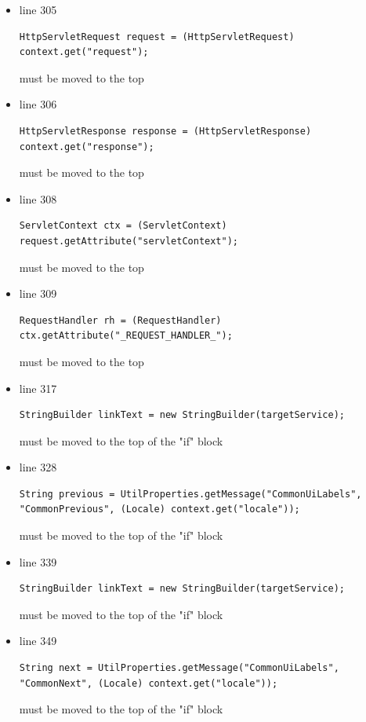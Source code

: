 \documentclass[english]{article}
\begin{document}
\begin{itemize}
{\begin{itemize}
{\begin{lstlisting}
int highIndex = (viewIndex + 1) * viewSize;
						\end{lstlisting} must be moved to the top}
				\item{line 305
						\begin{lstlisting}
HttpServletRequest request = (HttpServletRequest) context.get("request");
						\end{lstlisting} must be moved to the top}
				\item{line 306
						\begin{lstlisting}
HttpServletResponse response = (HttpServletResponse) context.get("response");
						\end{lstlisting} must be moved to the top}
				\item{line 308
						\begin{lstlisting}
ServletContext ctx = (ServletContext) request.getAttribute("servletContext");
						\end{lstlisting} must be moved to the top}
				\item{line 309
						\begin{lstlisting}
RequestHandler rh = (RequestHandler) ctx.getAttribute("_REQUEST_HANDLER_");
						\end{lstlisting} must be moved to the top}
				\item{line 317
						\begin{lstlisting}
StringBuilder linkText = new StringBuilder(targetService);
						\end{lstlisting} must be moved to the top of the "if" block}
				\item{line 328
						\begin{lstlisting}
String previous = UtilProperties.getMessage("CommonUiLabels", "CommonPrevious", (Locale) context.get("locale"));
						\end{lstlisting} must be moved to the top of the "if" block}
				\item{line 339
						\begin{lstlisting}
StringBuilder linkText = new StringBuilder(targetService);
						\end{lstlisting} must be moved to the top of the "if" block}
				\item{line 349
						\begin{lstlisting}
String next = UtilProperties.getMessage("CommonUiLabels", "CommonNext", (Locale) context.get("locale"));
						\end{lstlisting} must be moved to the top of the "if" block}
			\end{itemize}
		}
		

\end{itemize}
\end{document}

